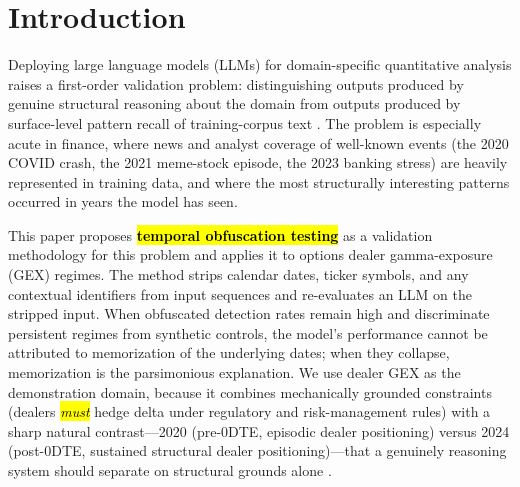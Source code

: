\documentclass[jrfm,article,accept,moreauthors,pdftex]{Definitions/mdpi}
\begin{document}
\section{Introduction}
\label{sec:introduction}

Deploying large language models (LLMs) for domain-specific quantitative analysis raises a first-order validation problem: distinguishing outputs produced by genuine structural reasoning about the domain from outputs produced by surface-level pattern recall of training-corpus text \citep{mccoy2023embers}. The problem is especially acute in finance, where news and analyst coverage of well-known events (the 2020 COVID crash, the 2021 meme-stock episode, the 2023 banking stress) are heavily represented in training data, and where the most structurally interesting patterns occurred in years the model has seen.

This paper proposes \textbf{\hl{temporal obfuscation testing}} %
as a validation methodology for this problem and applies it to options dealer gamma-exposure (GEX) regimes. The method strips calendar dates, ticker symbols, and any contextual identifiers from input sequences and re-evaluates an LLM on the stripped input. When obfuscated detection rates remain high and discriminate persistent regimes from synthetic controls, the model's performance cannot be attributed to memorization of the underlying dates; when they collapse, memorization is the parsimonious explanation. We use dealer GEX as the demonstration domain, because it combines mechanically grounded constraints (dealers \emph{\hl{must}} %
hedge delta under regulatory and risk-management rules) with a sharp natural contrast---2020 (pre-0DTE, episodic dealer positioning) versus 2024 (post-0DTE, sustained structural dealer positioning)---that a genuinely reasoning system should separate on structural grounds alone \citep{ni2005stock,garleanu2009demand,dim2023odtes}.
\end{document}
